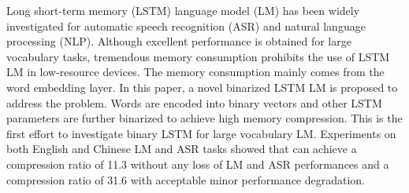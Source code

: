 Long short-term memory (LSTM) language model (LM) has been widely investigated for automatic speech recognition (ASR) and natural language processing (NLP). Although excellent performance is obtained for large vocabulary tasks, tremendous memory consumption prohibits the use of LSTM LM in low-resource devices. The memory consumption mainly comes from the word embedding layer. In this paper, a novel binarized LSTM LM is proposed to address the problem. Words are encoded into binary vectors and other LSTM parameters are further binarized to achieve high memory compression. This is the first effort to investigate binary LSTM for large vocabulary LM. Experiments on both English and Chinese LM and ASR tasks showed that can achieve a compression ratio of 11.3 without any loss of LM and ASR performances and a compression ratio of 31.6 with acceptable minor performance degradation.
